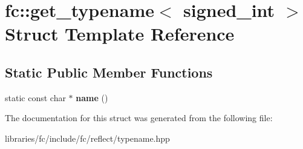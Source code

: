 \hypertarget{structfc_1_1get__typename_3_01signed__int_01_4}{}\section{fc\+:\+:get\+\_\+typename$<$ signed\+\_\+int $>$ Struct Template Reference}
\label{structfc_1_1get__typename_3_01signed__int_01_4}
\subsection*{Static Public Member Functions}
\begin{DoxyCompactItemize}
\item 
\mbox{\label{structfc_1_1get__typename_3_01signed__int_01_4_a14bac4c5a5e7e1d31a6e47bbd7c79db2}} 
static const char $\ast$ {\bfseries name} ()
\end{DoxyCompactItemize}


The documentation for this struct was generated from the following file\+:\begin{DoxyCompactItemize}
\item 
libraries/fc/include/fc/reflect/typename.\+hpp\end{DoxyCompactItemize}
